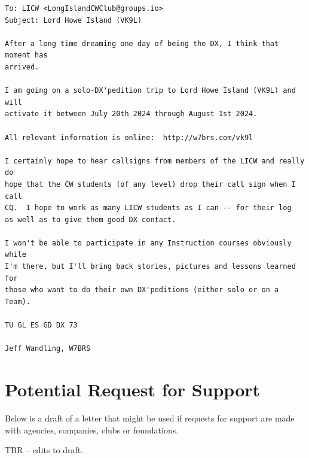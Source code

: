 \documentclass[11pt]{article}
\begin{document}
\begin{Verbatim}[fontsize=\small]
To: LICW <LongIslandCWClub@groups.io>
Subject: Lord Howe Island (VK9L)

After a long time dreaming one day of being the DX, I think that moment has
arrived.

I am going on a solo-DX'pedition trip to Lord Howe Island (VK9L) and will
activate it between July 20th 2024 through August 1st 2024.

All relevant information is online:  http://w7brs.com/vk9l

I certainly hope to hear callsigns from members of the LICW and really do
hope that the CW students (of any level) drop their call sign when I call
CQ.  I hope to work as many LICW students as I can -- for their log
as well as to give them good DX contact.

I won't be able to participate in any Instruction courses obviously while
I'm there, but I'll bring back stories, pictures and lessons learned for
those who want to do their own DX'peditions (either solo or on a Team).

TU GL ES GD DX 73

Jeff Wandling, W7BRS
\end{Verbatim}

\section{Potential Request for Support}

Below is a draft of a letter that might be used if
requests for support are made with agencies, companies,
clubs or foundations.

\par
TBR -- edits to draft.
\par
\end{document}

